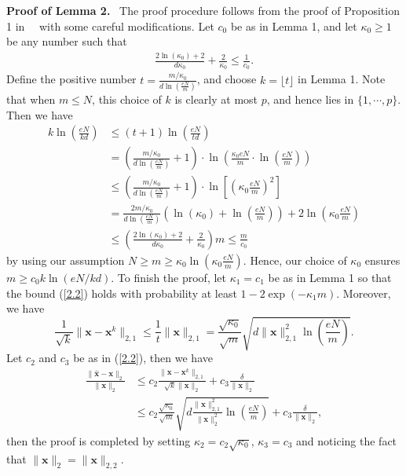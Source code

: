 \documentclass[journal,onecolumn]{IEEEtran}
\begin{document}
\noindent
{\bf Proof of Lemma 2.} \,\,\,The proof procedure follows from the proof of Proposition 1 in \cite{l2}　with some careful modifications. Let $c_0$ be as in Lemma 1, and let $\kappa_0\geq 1$ be any number such that \begin{align}
\frac{2\ln(\kappa_0)+2}{d\kappa_0}+\frac{2}{\kappa_0}\leq \frac{1}{c_0}.
\end{align}
Define the positive number $t=\frac{m/\kappa_0}{d\ln(\frac{eN}{m})}$, and choose $k=\lfloor t\rfloor$ in Lemma 1. Note that when $m\leq N$, this choice of $k$ is clearly at most $p$, and hence lies in $\{1,\cdots,p\}$. Then we have \begin{align*}
k\ln(\frac{eN}{kd})&\leq (t+1)\ln(\frac{eN}{td}) \\
&=\left(\frac{m/\kappa_0}{d\ln(\frac{eN}{m})}+1\right)\cdot \ln\left(\frac{\kappa_0 eN}{m}\cdot\ln(\frac{eN}{m})\right)\\
&\leq \left(\frac{m/\kappa_0}{d\ln(\frac{eN}{m})}+1\right)\cdot\ln\left[(\kappa_0\frac{eN}{m})^2\right]\\
&=\frac{2m/\kappa_0}{d\ln(\frac{eN}{m})}\left(\ln(\kappa_0)+\ln(\frac{eN}{m})\right)+2\ln(\kappa_0\frac{eN}{m})\\
&\leq\left(\frac{2\ln(\kappa_0)+2}{d\kappa_0}+\frac{2}{\kappa_0}\right)m\leq \frac{m}{c_0}
\end{align*}
by using our assumption $N\geq m\geq \kappa_0\ln(\kappa_0\frac{eN}{m})$. Hence, our choice of $\kappa_0$ ensures $m\geq c_0k\ln(eN/kd)$. To finish the proof, let $\kappa_1=c_1$ be as in Lemma 1 so that the bound (\ref{2.2}) holds with probability at least $1-2\exp(-\kappa_1 m)$. Moreover, we have $$
\frac{1}{\sqrt{k}}\lVert\mathbf{x}-\mathbf{x}^k\rVert_{2,1}\leq \frac{1}{t}\lVert\mathbf{x}\rVert_{2,1}=\frac{\sqrt{\kappa_0}}{\sqrt{m}}\sqrt{d\lVert\mathbf{x}\rVert_{2,1}^2\ln(\frac{eN}{m})}.
$$
Let $c_2$ and $c_3$ be as in (\ref{2.2}), then we have \begin{align*}
\frac{\lVert\hat{\mathbf{x}}-\mathbf{x}\rVert_2}{\lVert\mathbf{x}\rVert_2}&\leq c_2\frac{\lVert\mathbf{x}-\mathbf{x}^k\rVert_{2,1}}{\sqrt{k}\lVert\mathbf{x}\rVert_2}+c_3\frac{\delta}{\lVert\mathbf{x}\rVert_2}\\
&\leq c_2\frac{\sqrt{\kappa_0}}{\sqrt{m}}\sqrt{d\frac{\lVert\mathbf{x}\rVert_{2,1}^2}{\lVert\mathbf{x}\rVert_2^2}\ln(\frac{eN}{m})}
+c_3\frac{\delta}{\lVert\mathbf{x}\rVert_2},
\end{align*}
then the proof is completed by setting $\kappa_2=c_2\sqrt{\kappa_0}$, $\kappa_3=c_3$ and noticing the fact that $\lVert\mathbf{x}\rVert_2=\lVert\mathbf{x}\rVert_{2,2}$. \\
\end{document}
